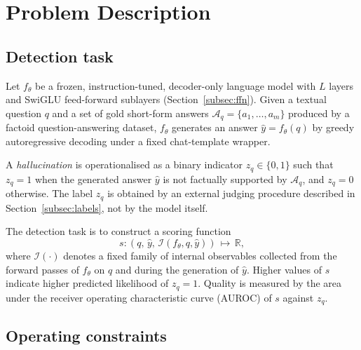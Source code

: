 \section{Problem Description}
\label{sec:problem_description}

\subsection{Detection task}
\label{subsec:task}

Let $f_\theta$ be a frozen, instruction-tuned, decoder-only language model
with $L$ layers and SwiGLU feed-forward sublayers
(Section~\ref{subsec:ffn}). Given a textual question $q$ and a set of gold
short-form answers $\mathcal{A}_q = \{a_1, \ldots, a_m\}$ produced by a
factoid question-answering dataset, $f_\theta$ generates an answer
$\hat{y} = f_\theta(q)$ by greedy autoregressive decoding under a fixed
chat-template wrapper.

A \emph{hallucination} is operationalised as a binary indicator $z_q \in
\{0, 1\}$ such that $z_q = 1$ when the generated answer $\hat{y}$ is not
factually supported by $\mathcal{A}_q$, and $z_q = 0$ otherwise. The label
$z_q$ is obtained by an external judging procedure described in
Section~\ref{subsec:labels}, not by the model itself.

The detection task is to construct a scoring function
\begin{equation}
    s : (q,\,\hat{y},\,\mathcal{I}(f_\theta, q, \hat{y})) \,\longmapsto\, \mathbb{R},
    \label{eq:detection_function}
\end{equation}
where $\mathcal{I}(\cdot)$ denotes a fixed family of internal observables
collected from the forward passes of $f_\theta$ on $q$ and during the
generation of $\hat{y}$. Higher values of $s$ indicate higher predicted
likelihood of $z_q = 1$. Quality is measured by the area under the receiver
operating characteristic curve (AUROC) of $s$ against $z_q$.

\subsection{Operating constraints}
\label{subsec:constraints}

